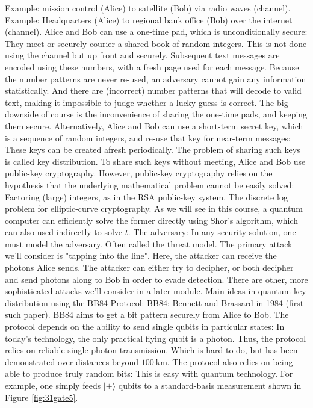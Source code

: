 \documentclass[main.tex]{subfiles}
\begin{document}
    Example: mission control (Alice) to satellite (Bob) via radio waves (channel). Example: Headquarters (Alice) to regional bank office (Bob) over the internet (channel). Alice and Bob can use a one-time pad, which is unconditionally secure: They meet or securely-courier a shared book of random integers. This is not done using the channel but up front and securely. Subsequent text messages are encoded using these numbers, with a fresh page used for each message. Because the number patterns are never re-used, an adversary cannot gain any information statistically. And there are (incorrect) number patterns that will decode to valid text, making it impossible to judge whether a lucky guess is correct. The big downside of course is the inconvenience of sharing the one-time pads, and keeping them secure. Alternatively, Alice and Bob can use a short-term secret key, which is a sequence of random integers, and re-use that key for near-term messages: These keys can be created afresh periodically. The problem of sharing such keys is called key distribution. To share such keys without meeting, Alice and Bob use public-key cryptography. However, public-key cryptography relies on the hypothesis that the underlying mathematical problem cannot be easily solved: Factoring (large) integers, as in the RSA public-key system. The discrete log problem for elliptic-curve cryptography. As we will see in this course, a quantum computer can efficiently solve the former directly using Shor's algorithm, which can also used indirectly to solve $t$. The adversary: In any security solution, one must model the adversary. Often called the threat model. The primary attack we'll consider is "tapping into the line". Here, the attacker can receive the photons Alice sends. The attacker can either try to decipher, or both decipher and send photons along to Bob in order to evade detection. There are other, more sophisticated attacks we'll consider in a later module. Main ideas in quantum key distribution using the BB84 Protocol: BB84: Bennett and Brassard in 1984 (first such paper). BB84 aims to get a bit pattern securely from Alice to Bob. The protocol depends on the ability to send single qubits in particular states: In today's technology, the only practical flying qubit is a photon. Thus, the protocol relies on reliable single-photon transmission. Which is hard to do, but has been demonstrated over distances beyond $100 \mathrm{~km}$. The protocol also relies on being able to produce truly random bits: This is easy with quantum technology. For example, one simply feeds $|+\rangle$ qubits to a standard-basis measurement shown in Figure \ref{fig:31gate5}.
    
\end{document}
